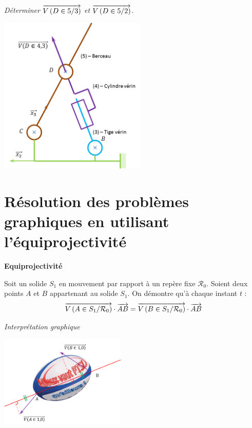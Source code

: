 \documentclass[11pt,oneside]{article}
\begin{document}
\begin{exemple}
\textit{Déterminer $\overrightarrow{V\left( {D} \in {5}/{3}\right)}$ et $\overrightarrow{V\left( {D} \in {5}/{2}\right)}$.}

\begin{center}
\includegraphics[width=7cm]{png/point}
\end{center}

\end{exemple}
\section{Résolution des problèmes graphiques en utilisant l'équiprojectivité}

\begin{resultat}
\textbf{Equiprojectivité}

Soit un solide $S_1$ en mouvement par rapport à un repère fixe $\mathcal{R}_0$. Soient deux points $A$ et $B$ appartenant au solide $S_1$. On démontre qu'à chaque instant $t$ :
$$
\overrightarrow{V\left( {A} \in {S_1}/{\mathcal{R}_0}\right)}\cdot \overrightarrow{AB} = 
\overrightarrow{V\left( {B} \in {S_1}/{\mathcal{R}_0}\right)}\cdot \overrightarrow{AB}
$$
\end{resultat}

\begin{exemple}
\textit{Interprétation graphique}

\begin{center}
\includegraphics[width=6cm]{png/ballon1}
\end{center}
\end{exemple}
\end{document}
